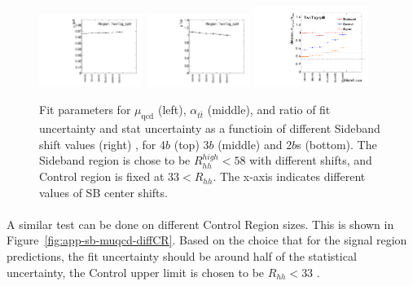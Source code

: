 \begin{figure}[htbp!]
\begin{center}
\includegraphics[angle=270, width=0.3\textwidth]{./figures/boosted/Appendix_SB/TwoTag_split_muqcdSBshift.pdf}
\includegraphics[angle=270, width=0.3\textwidth]{./figures/boosted/Appendix_SB/TwoTag_split_mutopSBshift.pdf}
\includegraphics[angle=270, width=0.33\textwidth]{./figures/boosted/Appendix_SB/data_est_TwoTag_split_sigma_compareSBshift.pdf}
  \caption{Fit parameters for $\mu_{\text{qcd}}$ (left), $\alpha_{t\bar{t}}$ (middle), and ratio of fit uncertainty and stat uncertainty as a functioin of different Sideband shift values (right) , for 4$b$ (top) 3$b$ (middle) and 2$b$s (bottom). The Sideband region is chose to be $R_{hh}^{high} < 58$ with different shifts, and Control region is fixed at $33 < R_{hh}$. The x-axis indicates different values of SB center shifts.}
  \label{fig:app-sb-muqcd-diffSBshift}
\end{center}
\end{figure}

\paragraph{} A similar test can be done on different Control Region sizes. This is shown in Figure~\ref{fig:app-sb-muqcd-diffCR}. Based on the choice that for the signal region predictions, the fit uncertainty should be around half of the statistical uncertainty, the Control upper limit is chosen to be $R_{hh} < 33$ \GeV.


